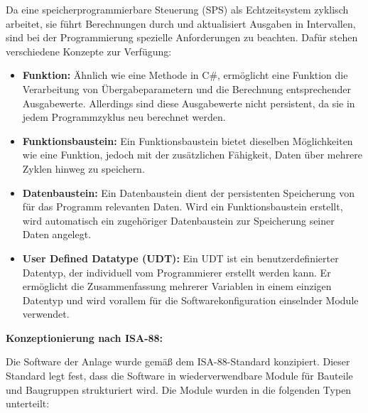 Da eine speicherprogrammierbare Steuerung (SPS) als Echtzeitsystem zyklisch arbeitet, sie führt 
Berechnungen durch und aktualisiert Ausgaben in Intervallen, sind bei der Programmierung spezielle Anforderungen 
zu beachten. Dafür stehen verschiedene Konzepte zur Verfügung:

\begin{itemize}
    \item \textbf{Funktion:} Ähnlich wie eine Methode in C\#, ermöglicht eine Funktion die Verarbeitung von Übergabeparametern 
    und die Berechnung entsprechender Ausgabewerte. Allerdings sind diese Ausgabewerte nicht persistent, da sie in jedem 
    Programmzyklus neu berechnet werden.
    \item \textbf{Funktionsbaustein:} Ein Funktionsbaustein bietet dieselben Möglichkeiten wie eine Funktion, jedoch mit der 
    zusätzlichen Fähigkeit, Daten über mehrere Zyklen hinweg zu speichern.
    \item \textbf{Datenbaustein:} Ein Datenbaustein dient der persistenten Speicherung von für das Programm relevanten Daten. 
    Wird ein Funktionsbaustein erstellt, wird automatisch ein zugehöriger Datenbaustein zur Speicherung seiner Daten angelegt.
    \item \textbf{User Defined Datatype (UDT):} Ein UDT ist ein benutzerdefinierter Datentyp, der individuell vom 
    Programmierer erstellt werden kann. Er ermöglicht die Zusammenfassung mehrerer Variablen in einem einzigen Datentyp und 
    wird vorallem für die Softwarekonfiguration einselnder Module verwendet.
\end{itemize}

\textbf{Konzeptionierung nach ISA-88:}

Die Software der Anlage wurde gemäß dem ISA-88-Standard konzipiert. Dieser Standard legt fest, dass die Software in 
wiederverwendbare Module für Bauteile und Baugruppen strukturiert wird. Die Module wurden in die folgenden Typen unterteilt:

